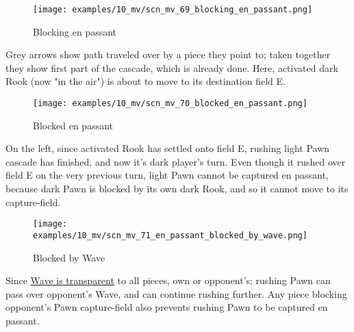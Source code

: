 
\noindent
\begin{wrapfigure}[7]{l}{0.4\textwidth}
\centering
\texttt{[image: examples/10\_mv/scn\_mv\_69\_blocking\_en\_passant.png]}
\vspace*{-1.4\baselineskip}
\caption{Blocking en passant}
\label{fig:scn_mv_69_blocking_en_passant}
\end{wrapfigure}
Grey arrows show path traveled over by a piece they point to; taken together they
show first part of the cascade, which is already done. \newline
\indent
Here, activated dark Rook (now "in the air") is about to move to its destination
field E.

\clearpage %

\vspace*{-2.1\baselineskip}
\noindent
\begin{wrapfigure}[10]{l}{0.4\textwidth}
\centering
\texttt{[image: examples/10\_mv/scn\_mv\_70\_blocked\_en\_passant.png]}
\vspace*{-1.4\baselineskip}
\caption{Blocked en passant}
\label{fig:scn_mv_70_blocked_en_passant}
\end{wrapfigure}
On the left, since activated Rook has settled onto field E, rushing light Pawn
cascade has finished, and now it's dark player's turn. \newline
\indent
Even though it rushed over field E on the very previous turn, light Pawn cannot
be captured en passant, because dark Pawn is blocked by its own dark Rook, and
so it cannot move to its capture-field.

\vspace*{3.7\baselineskip}
\noindent
\begin{wrapfigure}[13]{l}{0.4\textwidth}
\centering
\texttt{[image: examples/10\_mv/scn\_mv\_71\_en\_passant\_blocked\_by\_wave.png]}
\vspace*{-1.4\baselineskip}
\caption{Blocked by Wave}
\label{fig:scn_mv_71_en_passant_blocked_by_wave}
\end{wrapfigure}
Since \hyperref[fig:scn_mv_07_wave_is_transparent]{Wave is transparent} to all pieces,
own or opponent's; rushing Pawn can pass over opponent's Wave, and can continue rushing
further. Any piece blocking opponent's Pawn capture-field also prevents rushing Pawn to
be captured en passant.

